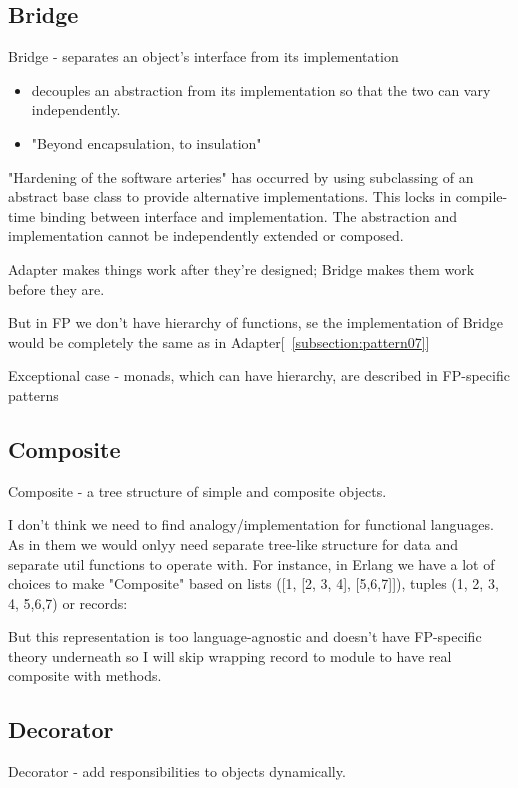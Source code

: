\subsection{Bridge} \label{subsection:pattern08}
Bridge - separates an object's interface from its implementation
    \begin{itemize}
        \item decouples an abstraction from its implementation so that the two can vary independently.
        \item "Beyond encapsulation, to insulation" ~\cite{res9}
    \end{itemize}
"Hardening of the software arteries" has occurred by using subclassing of an abstract base class to provide alternative implementations. This locks in compile-time binding between interface and implementation. The abstraction and implementation cannot be independently extended or composed.

Adapter makes things work after they're designed; Bridge makes them work before they are.

But in FP we don't have hierarchy of functions, se the implementation of Bridge would be completely the same as in Adapter[~\ref{subsection:pattern07}]

Exceptional case - monads, which can have hierarchy, are described in FP-specific patterns


\subsection{Composite} \label{subsection:pattern09}
Composite - a tree structure of simple and composite objects.

I don't think we need to find analogy/implementation for functional languages. As in them we would onlyy need separate tree-like structure for data and separate util functions to operate with. For instance, in Erlang we have a lot of choices to make "Composite" based on lists ([1, [2, 3, 4], [5,6,7]]), tuples ({1, {2, 3, 4}, {5,6,7}}) or records:

But this representation is too language-agnostic and doesn't have FP-specific theory underneath so I will skip wrapping record to module to have real composite with methods.


\subsection{Decorator} \label{subsection:pattern10}
    Decorator - add responsibilities to objects dynamically.

